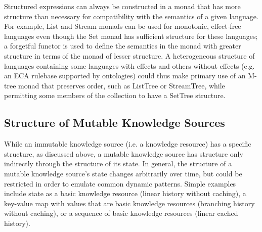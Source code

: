 \documentclass[runningheads]{llncs}
\begin{document}
Structured expressions can always be constructed in a monad that has more structure than necessary for compatibility with the semantics of a given language.
For example, List and Stream monads can be used for monotonic, effect-free languages even though the Set monad has sufficient structure for these languages;
a forgetful functor is used to define the semantics in the monad with greater structure in terms of the monad of lesser structure.
A heterogeneous structure of languages containing some languages with effects and others without effects (e.g. an ECA rulebase supported by ontologies) could thus make primary use of an M-tree monad that preserves order, such as ListTree or StreamTree, while permitting some members of the collection to have a SetTree structure. 



\subsection{Structure of Mutable Knowledge Sources}
While an immutable knowledge source (i.e. a knowledge resource) has a specific structure, as discussed above, a mutable knowledge source has structure only indirectly through the structure of its state. In general, the structure of a mutable knowledge source's state changes arbitrarily over time, but could be restricted in order to emulate common dynamic patterns. Simple examples include state as a basic knowledge resource (linear history without caching), a key-value map with values that are basic knowledge resources (branching history without caching), or a sequence of basic knowledge resources (linear cached history). 
\end{document}
